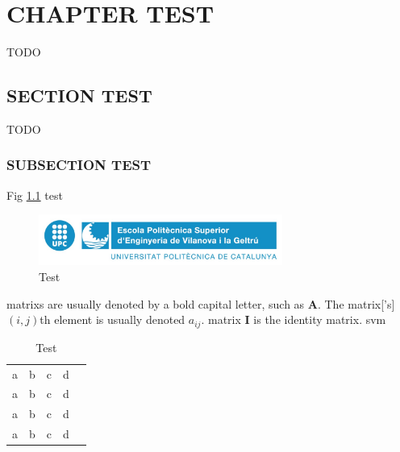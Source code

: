 \newpage
\pagestyle{plain}

\chapter{CHAPTER TEST}

TODO
\section{SECTION TEST}

TODO

\subsection{SUBSECTION TEST}

Fig \ref{fig:test} test

\begin{figure}[h]
    \includegraphics[width=8cm]{media/epsevg_logo}
    \centering
    \caption{Test}
    \label{fig:test}
\end{figure}

\Glspl{matrix} are usually denoted by a bold capital letter, such as $\mathbf{A}$. The \gls{matrix}['s] $(i,j)$th element is usually denoted $a_{ij}$. \Gls{matrix} $\mathbf{I}$ is the identity \gls{matrix}. 
\gls{svm}

\begin{table}[]
\centering
\begin{tabular}{lllll}
  a  & b & c & d &  \\
  a  & b & c & d &  \\
  a  & b & c & d &  \\
  a  & b & c & d & 
\end{tabular}
\caption{Test}
\label{table:test}
\end{table}